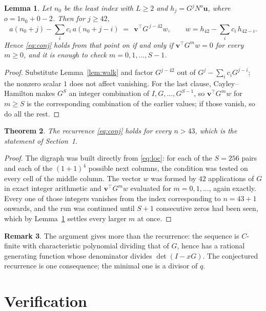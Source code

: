 \documentclass[11pt,a4paper]{article}
\theoremstyle{plain}
\newtheorem{theorem}{Theorem}
\newtheorem{lemma}[theorem]{Lemma}
\theoremstyle{definition}
\newtheorem{remark}[theorem]{Remark}
\begin{document}
\begin{lemma}\label{lem:crit}
Let $n_0$ be the least index with $L\ge2$ and $h_j=G^{j}N^{o}\mathbf{u}$, where
$o=1n_0+0-2$. Then for $j\ge42$,
\[
a(n_0+j)-\sum_i c_i\,a(n_0+j-i)\;=\;\,\mathbf{v}^{\!\top}G^{\,j-42}w,
\qquad w=h_{42}-\sum_i c_i\,h_{42-i} .
\]
Hence \eqref{eq:conj} holds from that point on if and only if
$\mathbf{v}^{\!\top}G^{m}w=0$ for every $m\ge0$, and it is enough to check
$m=0,1,\dots,S-1$.
\end{lemma}

\begin{proof}
Substitute Lemma~\ref{lem:walk} and factor $G^{j-42}$ out of
$G^{j}-\sum_ic_iG^{j-i}$; the nonzero scalar $1$ does not affect
vanishing. For the last clause, Cayley--Hamilton makes $G^{S}$ an integer combination of
$I,G,\dots,G^{S-1}$, so $\mathbf{v}^{\!\top}G^{m}w$ for $m\ge S$ is the corresponding
combination of the earlier values; if those vanish, so do all the rest.
\end{proof}

\begin{theorem}
The recurrence \eqref{eq:conj} holds for every $n>43$, which is the statement of
Section~1.
\end{theorem}

\begin{proof}
The digraph was built directly from \eqref{eq:loc}: for each of the $S=256$ pairs and each
of the $(1+1)^{4}$ possible next columns, the condition was tested on every cell of
the middle column. The vector $w$ was formed by $42$ applications of $G$ in exact integer
arithmetic and $\mathbf{v}^{\!\top}G^{m}w$ evaluated for $m=0,1,\dots$, again exactly.
Every one of those integers vanishes from the index corresponding to $n=43+1$ onwards,
and the run was continued until $S+1$ consecutive zeros had been seen, which by
Lemma~\ref{lem:crit} settles every larger $m$ at once.
\end{proof}

\begin{remark}
The argument gives more than the recurrence: the sequence is $C$-finite with characteristic
polynomial dividing that of $G$, hence has a rational generating function whose denominator
divides $\det(I-xG)$. The conjectured recurrence is one consequence; the minimal one is a
divisor of $q$.
\end{remark}

\section{Verification}
\end{document}
